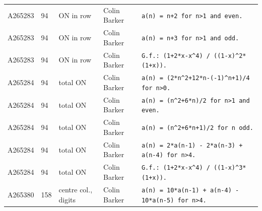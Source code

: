 \documentclass[11pt]{article}
\theoremstyle{definition}
\theoremstyle{remark}
\begin{document}
{\begin{longtable}{p{1.3cm}p{0.7cm}p{2.4cm}p{2.3cm}p{7.3cm}}
A265283 & 94 & ON in row & Colin Barker & \texttt{a(n)\allowbreak{} \allowbreak{}=\allowbreak{} \allowbreak{}n+\allowbreak{}2 \allowbreak{}for \allowbreak{}n>1 \allowbreak{}and \allowbreak{}even.} \\
A265283 & 94 & ON in row & Colin Barker & \texttt{a(n)\allowbreak{} \allowbreak{}=\allowbreak{} \allowbreak{}n+\allowbreak{}3 \allowbreak{}for \allowbreak{}n>1 \allowbreak{}and \allowbreak{}odd.} \\
A265283 & 94 & ON in row & Colin Barker & \texttt{G.f.: \allowbreak{}(1+\allowbreak{}2*\allowbreak{}x-\allowbreak{}x\^{}4)\allowbreak{} \allowbreak{}/\allowbreak{} \allowbreak{}((1-\allowbreak{}x)\allowbreak{}\^{}2*\allowbreak{}(1+\allowbreak{}x)\allowbreak{})\allowbreak{}.} \\
A265284 & 94 & total ON & Colin Barker & \texttt{a(n)\allowbreak{} \allowbreak{}=\allowbreak{} \allowbreak{}(2*\allowbreak{}n\^{}2+\allowbreak{}12*\allowbreak{}n-\allowbreak{}(-\allowbreak{}1)\allowbreak{}\^{}n+\allowbreak{}1)\allowbreak{}/\allowbreak{}4 \allowbreak{}for \allowbreak{}n>0.} \\
A265284 & 94 & total ON & Colin Barker & \texttt{a(n)\allowbreak{} \allowbreak{}=\allowbreak{} \allowbreak{}(n\^{}2+\allowbreak{}6*\allowbreak{}n)\allowbreak{}/\allowbreak{}2 \allowbreak{}for \allowbreak{}n>1 \allowbreak{}and \allowbreak{}even.} \\
A265284 & 94 & total ON & Colin Barker & \texttt{a(n)\allowbreak{} \allowbreak{}=\allowbreak{} \allowbreak{}(n\^{}2+\allowbreak{}6*\allowbreak{}n+\allowbreak{}1)\allowbreak{}/\allowbreak{}2 \allowbreak{}for \allowbreak{}n \allowbreak{}odd.} \\
A265284 & 94 & total ON & Colin Barker & \texttt{a(n)\allowbreak{} \allowbreak{}=\allowbreak{} \allowbreak{}2*\allowbreak{}a(n-\allowbreak{}1)\allowbreak{} \allowbreak{}-\allowbreak{} \allowbreak{}2*\allowbreak{}a(n-\allowbreak{}3)\allowbreak{} \allowbreak{}+\allowbreak{} \allowbreak{}a(n-\allowbreak{}4)\allowbreak{} \allowbreak{}for \allowbreak{}n>4.} \\
A265284 & 94 & total ON & Colin Barker & \texttt{G.f.: \allowbreak{}(1+\allowbreak{}2*\allowbreak{}x-\allowbreak{}x\^{}4)\allowbreak{} \allowbreak{}/\allowbreak{} \allowbreak{}((1-\allowbreak{}x)\allowbreak{}\^{}3*\allowbreak{}(1+\allowbreak{}x)\allowbreak{})\allowbreak{}.} \\
A265380 & 158 & centre col., digits & Colin Barker & \texttt{a(n)\allowbreak{} \allowbreak{}=\allowbreak{} \allowbreak{}10*\allowbreak{}a(n-\allowbreak{}1)\allowbreak{} \allowbreak{}+\allowbreak{} \allowbreak{}a(n-\allowbreak{}4)\allowbreak{} \allowbreak{}-\allowbreak{} \allowbreak{}10*\allowbreak{}a(n-\allowbreak{}5)\allowbreak{} \allowbreak{}for \allowbreak{}n>4.} \\

\end{longtable}}
\end{document}

